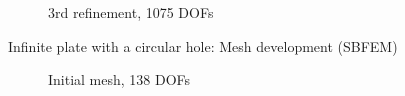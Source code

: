 \begin{figure}[h!]
\begin{subfigure}[b]{0.4\linewidth}
{        }
        \caption{3rd refinement, 1075 DOFs}
    \end{subfigure}
    \caption{Infinite plate with a circular hole: Mesh development (SBFEM)}
    \label{adap_fig:ex_chole_mesh_sbfem}
\end{figure}

\begin{figure}[h!]
    \centering
    \begin{subfigure}[b]{0.48\linewidth}
        \centering
        \caption{Initial mesh, 138 DOFs}
    \end{subfigure}
    \begin{subfigure}[b]{0.48\linewidth}
        \centering
        \scalebox{0.4}{
}
\end{subfigure}
\end{figure}
